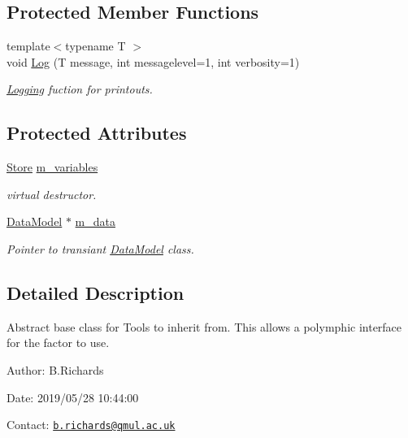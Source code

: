 \subsection*{Protected Member Functions}
\begin{DoxyCompactItemize}
\item 
{\footnotesize template$<$typename T $>$ }\\void \hyperlink{classTool_a46f7e599888302feefcf25e4f6cb4f9e}{Log} (T message, int messagelevel=1, int verbosity=1)
\begin{DoxyCompactList}\small\item\em \hyperlink{classLogging}{Logging} fuction for printouts. \end{DoxyCompactList}\end{DoxyCompactItemize}
\subsection*{Protected Attributes}
\begin{DoxyCompactItemize}
\item 
\hyperlink{classStore}{Store} \hyperlink{classTool_a208aed50c1c50212d2927b372c38763f}{m\-\_\-variables}
\begin{DoxyCompactList}\small\item\em virtual destructor. \end{DoxyCompactList}\item 
\hypertarget{classTool_a98d3ffa12f1de908da9030c8718ce3f5}{\hyperlink{classDataModel}{Data\-Model} $\ast$ \hyperlink{classTool_a98d3ffa12f1de908da9030c8718ce3f5}{m\-\_\-data}}\label{classTool_a98d3ffa12f1de908da9030c8718ce3f5}

\begin{DoxyCompactList}\small\item\em Pointer to transiant \hyperlink{classDataModel}{Data\-Model} class. \end{DoxyCompactList}\end{DoxyCompactItemize}


\subsection{Detailed Description}
Abstract base class for Tools to inherit from. This allows a polymphic interface for the factor to use.

\begin{DoxyParagraph}{Author\-:}
B.\-Richards 
\end{DoxyParagraph}
\begin{DoxyParagraph}{Date\-:}
2019/05/28 10\-:44\-:00 
\end{DoxyParagraph}
Contact\-: \href{mailto:b.richards@qmul.ac.uk}{\tt b.\-richards@qmul.\-ac.\-uk} 

